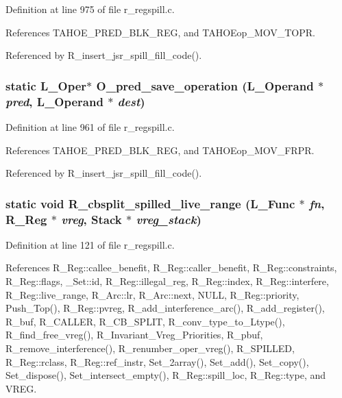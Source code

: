 Definition at line 975 of file r\_\-regspill.c.

References TAHOE\_\-PRED\_\-BLK\_\-REG, and TAHOEop\_\-MOV\_\-TOPR.

Referenced by R\_\-insert\_\-jsr\_\-spill\_\-fill\_\-code().
\subsubsection{\setlength{\rightskip}{0pt plus 5cm}static L\_\-Oper$\ast$ O\_\-pred\_\-save\_\-operation (L\_\-Operand $\ast$ {\em pred}, L\_\-Operand $\ast$ {\em dest})\hspace{0.3cm}{\tt  [static]}}\label{r__regspill_8c_e8b27599cd550519351e5663ed271667}




Definition at line 961 of file r\_\-regspill.c.

References TAHOE\_\-PRED\_\-BLK\_\-REG, and TAHOEop\_\-MOV\_\-FRPR.

Referenced by R\_\-insert\_\-jsr\_\-spill\_\-fill\_\-code().
\subsubsection{\setlength{\rightskip}{0pt plus 5cm}static void R\_\-cbsplit\_\-spilled\_\-live\_\-range (L\_\-Func $\ast$ {\em fn}, \bf{R\_\-Reg} $\ast$ {\em vreg}, \bf{Stack} $\ast$ {\em vreg\_\-stack})\hspace{0.3cm}{\tt  [static]}}\label{r__regspill_8c_e3f63c4cb3d3df638e13989228ca8cad}




Definition at line 121 of file r\_\-regspill.c.

References R\_\-Reg::callee\_\-benefit, R\_\-Reg::caller\_\-benefit, R\_\-Reg::constraints, R\_\-Reg::flags, \_\-Set::id, R\_\-Reg::illegal\_\-reg, R\_\-Reg::index, R\_\-Reg::interfere, R\_\-Reg::live\_\-range, R\_\-Arc::lr, R\_\-Arc::next, NULL, R\_\-Reg::priority, Push\_\-Top(), R\_\-Reg::pvreg, R\_\-add\_\-interference\_\-arc(), R\_\-add\_\-register(), R\_\-buf, R\_\-CALLER, R\_\-CB\_\-SPLIT, R\_\-conv\_\-type\_\-to\_\-Ltype(), R\_\-find\_\-free\_\-vreg(), R\_\-Invariant\_\-Vreg\_\-Priorities, R\_\-pbuf, R\_\-remove\_\-interference(), R\_\-renumber\_\-oper\_\-vreg(), R\_\-SPILLED, R\_\-Reg::rclass, R\_\-Reg::ref\_\-instr, Set\_\-2array(), Set\_\-add(), Set\_\-copy(), Set\_\-dispose(), Set\_\-intersect\_\-empty(), R\_\-Reg::spill\_\-loc, R\_\-Reg::type, and VREG.

